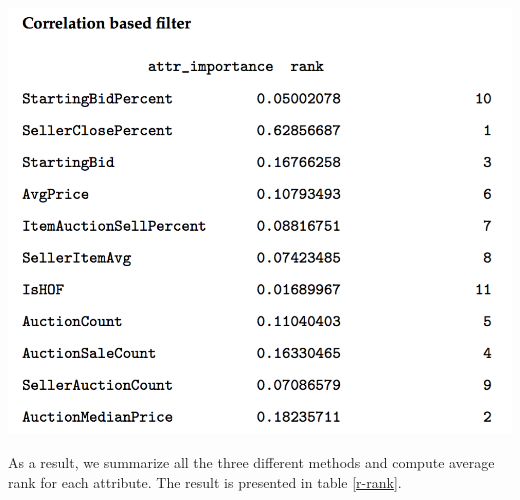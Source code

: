 \documentclass[CEJM,PDF]{cej} %
\begin{document}
\begin{center}
\mbox{}\\
\includegraphics[scale=0.5]{correlation.png}\\
\end{center}
As a result, we summarize all the three different methods and compute average rank for each attribute. The result is presented in table \ref{r-rank}.
\end{document}

